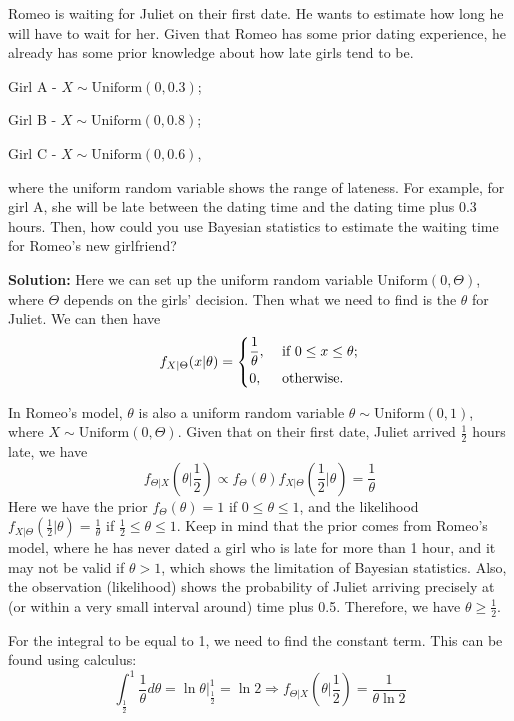 \begin{eg}
  Romeo is waiting for Juliet on their first date. He wants to estimate how long he will have to wait for her. Given that Romeo has some prior dating experience, he already has some prior knowledge about how late girls tend to be.
  
  Girl A - \(X \sim \text{Uniform}(0, 0.3)\); 
  
  Girl B - \(X \sim \text{Uniform}(0, 0.8)\); 

  Girl C - \(X \sim \text{Uniform}(0, 0.6)\), 

  where the uniform random variable shows the range of lateness. For example, for girl A, she will be late between the dating time and the dating time plus 0.3 hours. Then, how could you use Bayesian statistics to estimate the waiting time for Romeo's new girlfriend? 

  \textbf{Solution:} 
  Here we can set up the uniform random variable \(\text{Uniform}(0, \Theta)\), where \(\Theta\) depends on the girls' decision. Then what we need to find is the \(\theta\) for Juliet. We can then have 
  \[
    f_{X \vert \Theta}(x \vert \theta) = \begin{dcases}
      \frac{1}{\theta}, &\text{ if } 0 \leq x \leq \theta ;\\
      0, &\text{ otherwise} .
    \end{dcases}
  \]

  In Romeo's model, \(\theta\) is also a uniform random variable \(\theta \sim \text{Uniform}(0, 1)\), where \(X \sim \text{Uniform}(0, \Theta)\). Given that on their first date, Juliet arrived \(\frac{1}{2}\) hours late, we have 
  \[
    f_{\Theta \vert X} (\theta \vert \dfrac{1}{2}) \propto f_\Theta (\theta) f_{X \vert \Theta}(\dfrac{1}{2} \vert \theta) = \dfrac{1}{\theta}
  \]
  Here we have the prior \(f_\Theta(\theta) = 1\) if \(0 \leq \theta \leq 1\), and the likelihood \(f_{X \vert \Theta} (\frac{1}{2} \vert \theta) = \frac{1}{\theta}\) if \(\frac{1}{2} \leq \theta \leq 1\). Keep in mind that the prior comes from Romeo's model, where he has never dated a girl who is late for more than 1 hour, and it may not be valid if \(\theta > 1\), which shows the limitation of Bayesian statistics. Also, the observation (likelihood) shows the probability of Juliet arriving precisely at (or within a very small interval around) time plus 0.5. Therefore, we have \(\theta \geq \frac{1}{2}\). 

  For the integral to be equal to 1, we need to find the constant term. This can be found using calculus: 
  \[
    \int_\frac{1}{2} ^1 \dfrac{1}{\theta} d \theta= \ln \theta \Big|_{\frac{1}{2}}^1 = \ln 2 \Longrightarrow f_{\Theta \vert X} (\theta \vert \dfrac{1}{2}) = \dfrac{1}{\theta \ln 2}
  \]


\end{eg}
